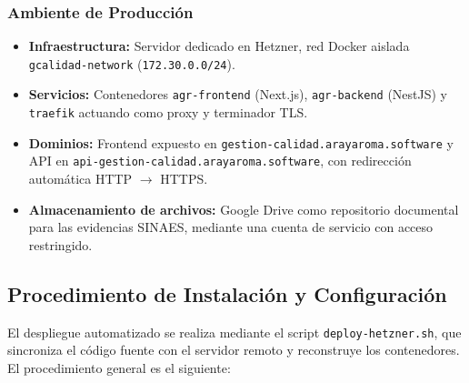 \subsubsection{Ambiente de Producción}
\begin{itemize}
    \item \textbf{Infraestructura:} Servidor dedicado en Hetzner, red Docker aislada \texttt{gcalidad-network} (\texttt{172.30.0.0/24}).
    \item \textbf{Servicios:} Contenedores \texttt{agr-frontend} (Next.js), \texttt{agr-backend} (NestJS) y \texttt{traefik} actuando como proxy y terminador TLS.
    \item \textbf{Dominios:} Frontend expuesto en \texttt{gestion-calidad.arayaroma.software} y API en \texttt{api-gestion-calidad.arayaroma.software}, con redirección automática HTTP $\rightarrow$ HTTPS.
    \item \textbf{Almacenamiento de archivos:} Google Drive como repositorio documental para las evidencias SINAES, mediante una cuenta de servicio con acceso restringido.
\end{itemize}

\subsection{Procedimiento de Instalación y Configuración}

El despliegue automatizado se realiza mediante el script \texttt{deploy-hetzner.sh}, que sincroniza el código fuente con el servidor remoto y reconstruye los contenedores. El procedimiento general es el siguiente:

